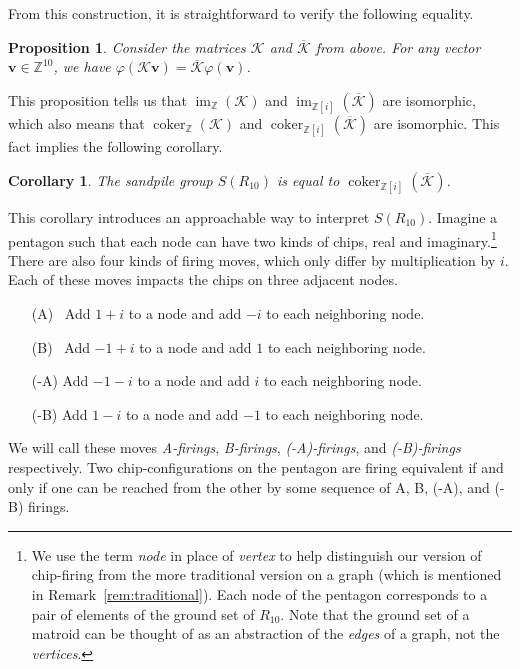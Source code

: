 \documentclass[12p]{amsart}
\numberwithin{equation}{section}
\theoremstyle{plain}
\newtheorem{prop}[thm]{Proposition}
\newtheorem{cor}[thm]{Corollary}
\theoremstyle{definition}
\newcommand{\Z}{\mathbb {Z}}
\newcommand{\mbf}{\mathbf}
\DeclareMathOperator{\im}{im}
\DeclareMathOperator{\coker}{coker}
\begin{document}
From this construction, it is straightforward to verify the following equality. 
\begin{prop}
    Consider the matrices $\mathcal K$ and $\overline{\mathcal K}$ from above. For any vector $\mbf v \in \Z^{10}$, we have $\varphi(\mathcal K \mbf v) = \overline{\mathcal K}\varphi(\mbf v)$.
\end{prop}

This proposition tells us that $\im_{\Z} (\mathcal K)$ and $\im_{\Z[i]} (\overline{\mathcal K})$ are isomorphic, which also means that $\coker_{\Z} (\mathcal K)$ and $\coker_{\Z[i]} (\overline{\mathcal K})$ are isomorphic. This fact implies the following corollary.

\begin{cor}
    The sandpile group $S(R_{10})$ is equal to $\coker_{\Z[i]} (\overline{\mathcal K})$. 
\end{cor}

This corollary introduces an approachable way to interpret $S(R_{10})$. Imagine a pentagon such that each node can have two kinds of chips, real and imaginary.\footnote{We use the term \emph{node} in place of \emph{vertex} to help distinguish our version of chip-firing from the more traditional version on a graph (which is mentioned in Remark~\ref{rem:traditional}). Each node of the pentagon corresponds to a pair of elements of the ground set of $R_{10}$. Note that the ground set of a matroid can be thought of as an abstraction of the \emph{edges} of a graph, not the \emph{vertices}.} There are also four kinds of firing moves, which only differ by multiplication by $i$. Each of these moves impacts the chips on three adjacent nodes. 


\begin{itemize}
    \item[(A)~] Add $1+i$ to a node and add $-i$ to each neighboring node. 
    \item[(B)~] Add $-1+i$ to a node and add $1$ to each neighboring node. 
    \item[(-A)] Add $-1-i$ to a node and add $i$ to each neighboring node. 
    \item[(-B)] Add $1-i$ to a node and add $-1$ to each neighboring node. 
\end{itemize}

We will call these moves \emph{A-firings}, \emph{B-firings}, \emph{(-A)-firings}, and \emph{(-B)-firings} respectively. Two chip-configurations on the pentagon are firing equivalent if and only if one can be reached from the other by some sequence of A, B, (-A), and (-B) firings. 
\end{document}
